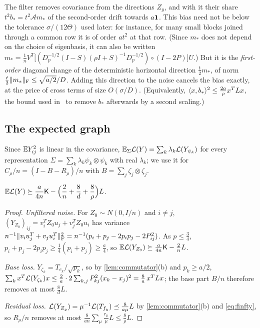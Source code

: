 \begin{remark}\label{rem:drift}
The filter removes covariance from the directions $Z_y$, and with it their share
$t^2b_*=t^2\mathcal Am_*$ of the second-order drift towards $a\mathbf 1$. This bias
need not be below the tolerance $\sigma/(12\Theta)$ used later: for instance, for
many small blocks joined through a common row it is of order $at^2$ at that row.
(Since $m_*$ does not depend on the choice of eigenbasis, it can also be written
$m_*=\frac1nV^T\bigl[(D_p^{-1/2}(I-S)(\rho I+S)^{-1}D_p^{-1/2})\circ(I-2P)\bigr]U$.)
But it is the \emph{first-order} diagonal change of
the deterministic horizontal direction $\frac t2m_*$, of norm
$\frac t2\lVert m_*\rVert_{\mathrm F}\le\sqrt{a/2}/D$. Adding this direction to the noise cancels
the bias exactly, at the price of cross terms of size $O(\sigma/D)$.
(Equivalently, $\langle x,b_*\rangle^2\le\frac{2a}\rho x^TLx$, the bound used
in~\cite{Orig} to remove $b_*$ afterwards by a second scaling.)
\end{remark}

\subsection{The expected graph}

Since $\mathbb E Y_{ij}^2$ is linear in the covariance, $\mathbb E_\Sigma\mathcal L(Y)=\sum_k\lambda_k
\mathcal L(Y_{\psi_k})$ for every representation $\Sigma=\sum_k\lambda_k\psi_k\otimes\psi_k$
with real $\lambda_k$; we use it for $C_\rho/n=(I-B-R_\rho)/n$ with
$B=\sum_j\zeta_j\otimes\zeta_j$.

\begin{lemma}\label{lem:expected-graph}
$\displaystyle\mathbb E\mathcal L(Y)\succeq\frac a{4n}\mathsf K-\Bigl(\frac2n+\frac8d+\frac8\rho\Bigr)L$.
\end{lemma}

\begin{proof}
\emph{Unfiltered noise.} For $Z_0\sim N(0,I/n)$ and $i\ne j$,
$(Y_{Z_0})_{ij}=v_i^TZ_0u_j+v_j^TZ_0u_i$ has variance
$n^{-1}\lVert v_iu_j^T+v_ju_i^T\rVert_{\mathrm F}^2=n^{-1}(p_i+p_j-2p_ip_j-2P_{ij}^2)$. As
$p\le\frac34$, $p_i+p_j-2p_ip_j\ge\frac14(p_i+p_j)\ge\frac a4$, so
$\mathbb E\mathcal L(Y_{Z_0})\succeq\frac a{4n}\mathsf K-\frac2nL$.

\emph{Base loss.} $Y_{\zeta_k}=T_{e_k}/\sqrt{p_k}$, so by
\cref{lem:commutator}(b) and $p_k\ge a/2$,
$\sum_kx^T\mathcal L(Y_{\zeta_k})x\le\frac2a\cdot2\sum_{k,j}P_{kj}^2(x_k-x_j)^2
=\frac8a\,x^TLx$; the base part $B/n$ therefore removes at most $\frac8dL$.

\emph{Residual loss.} $\mathcal L(Y_{Z_y})=\mu^{-1}\mathcal L(T_{f_y})\preceq\frac8{a\mu}L$ by
\cref{lem:commutator}(b) and \eqref{eq:finfty}, so $R_\rho/n$ removes at most
$\frac8{an}\sum_\mu\frac{r_\mu}\mu L\le\frac8\rho L$.
\end{proof}


